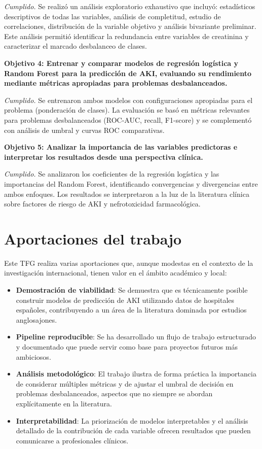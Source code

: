 \documentclass[12pt, a4paper, oneside]{report}
\begin{document}
\textit{Cumplido.} Se realizó un análisis exploratorio exhaustivo que incluyó: estadísticos descriptivos de todas las variables, análisis de completitud, estudio de correlaciones, distribución de la variable objetivo y análisis bivariante preliminar. Este análisis permitió identificar la redundancia entre variables de creatinina y caracterizar el marcado desbalanceo de clases.

\textbf{Objetivo 4: Entrenar y comparar modelos de regresión logística y Random Forest para la predicción de AKI, evaluando su rendimiento mediante métricas apropiadas para problemas desbalanceados.}

\textit{Cumplido.} Se entrenaron ambos modelos con configuraciones apropiadas para el problema (ponderación de clases). La evaluación se basó en métricas relevantes para problemas desbalanceados (ROC-AUC, recall, F1-score) y se complementó con análisis de umbral y curvas ROC comparativas.

\textbf{Objetivo 5: Analizar la importancia de las variables predictoras e interpretar los resultados desde una perspectiva clínica.}

\textit{Cumplido.} Se analizaron los coeficientes de la regresión logística y las importancias del Random Forest, identificando convergencias y divergencias entre ambos enfoques. Los resultados se interpretaron a la luz de la literatura clínica sobre factores de riesgo de AKI y nefrotoxicidad farmacológica.

\section{Aportaciones del trabajo}

Este TFG realiza varias aportaciones que, aunque modestas en el contexto de la investigación internacional, tienen valor en el ámbito académico y local:

\begin{itemize}
    \item \textbf{Demostración de viabilidad}: Se demuestra que es técnicamente posible construir modelos de predicción de AKI utilizando datos de hospitales españoles, contribuyendo a un área de la literatura dominada por estudios anglosajones.
    
    \item \textbf{Pipeline reproducible}: Se ha desarrollado un flujo de trabajo estructurado y documentado que puede servir como base para proyectos futuros más ambiciosos.
    
    \item \textbf{Análisis metodológico}: El trabajo ilustra de forma práctica la importancia de considerar múltiples métricas y de ajustar el umbral de decisión en problemas desbalanceados, aspectos que no siempre se abordan explícitamente en la literatura.
    
    \item \textbf{Interpretabilidad}: La priorización de modelos interpretables y el análisis detallado de la contribución de cada variable ofrecen resultados que pueden comunicarse a profesionales clínicos.
\end{itemize}
\end{document}

